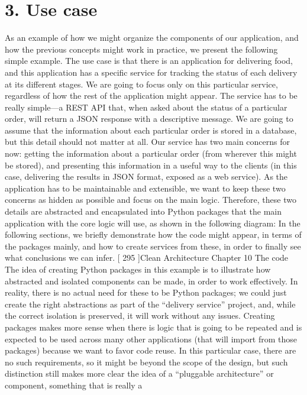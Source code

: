 \documentclass[a4paper,10pt,english]{sphinxmanual}
\begin{document}
\section{3. Use case}
\label{\detokenize{chapters/10_clean_architecture/index:use-case}}
As an example of how we might organize the components of our application, and how the
previous concepts might work in practice, we present the following simple example.
The use case is that there is an application for delivering food, and this application has a
specific service for tracking the status of each delivery at its different stages. We are going
to focus only on this particular service, regardless of how the rest of the application might
appear. The service has to be really simple—a REST API that, when asked about the status
of a particular order, will return a JSON response with a descriptive message.
We are going to assume that the information about each particular order is stored in a
database, but this detail should not matter at all.
Our service has two main concerns for now: getting the information about a particular
order (from wherever this might be stored), and presenting this information in a useful way
to the clients (in this case, delivering the results in JSON format, exposed as a web service).
As the application has to be maintainable and extensible, we want to keep these two
concerns as hidden as possible and focus on the main logic. Therefore, these two details are
abstracted and encapsulated into Python packages that the main application with the core
logic will use, as shown in the following diagram:
In the following sections, we briefly demonstrate how the code might appear, in terms of
the packages mainly, and how to create services from these, in order to finally see what
conclusions we can infer.
{[} 295 {]}Clean Architecture
Chapter 10
The code
The idea of creating Python packages in this example is to illustrate how abstracted and
isolated components can be made, in order to work effectively. In reality, there is no actual
need for these to be Python packages; we could just create the right abstractions as part of
the “delivery service” project, and, while the correct isolation is preserved, it will work
without any issues.
Creating packages makes more sense when there is logic that is going to be repeated and is
expected to be used across many other applications (that will import from those packages)
because we want to favor code reuse. In this particular case, there are no such
requirements, so it might be beyond the scope of the design, but such distinction still makes
more clear the idea of a “pluggable architecture” or component, something that is really a
\end{document}
